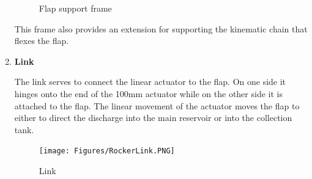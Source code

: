 \begin{enumerate}
\begin{figure}[H]
        \caption{Flap support frame}
        \label{fig:flap_support_frame}
    \end{figure}
    This frame also provides an extension for supporting the kinematic chain that flexes the flap. 
    \item \textbf{Link}
    \par
    The link serves to connect the linear actuator to the flap.  On one side it hinges onto the end of the 100mm actuator while on the other side it is attached to the flap. The linear movement of the actuator moves the flap to either to direct the discharge into the main reservoir or into the collection tank.
    \begin{figure}[H]
        \centering
        \texttt{[image: Figures/RockerLink.PNG]}
        \caption{Link}
        \label{fig:my_label}
    \end{figure}

\end{enumerate}

